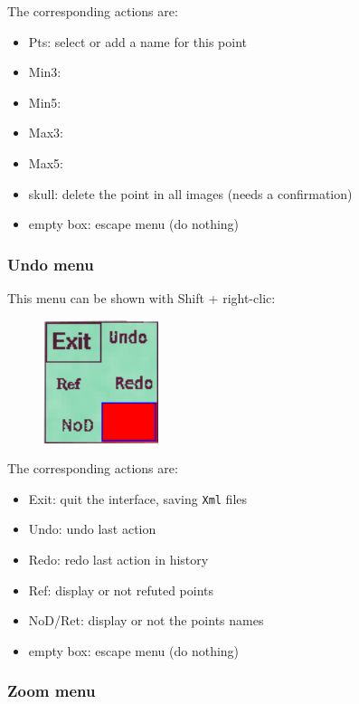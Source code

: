 The corresponding actions are:
\begin{itemize}
\item Pts: select or add a name for this point
\item Min3:
\item Min5:
\item Max3:
\item Max5:
\item skull: delete the point in all images (needs a confirmation)
\item empty box: escape menu (do nothing)
\end{itemize}

\subsubsection{Undo menu}

This menu can be shown with Shift + right-clic:

\begin{figure}[H]
\begin{center}
\includegraphics[width=95pt]{FIGS/Saisie/contextual.png}
\end{center}
\label{FIG:contextual}
\end{figure}

The corresponding actions are:

\begin{itemize}
\item Exit: quit the interface, saving {\tt Xml} files
\item Undo: undo last action
\item Redo: redo last action in history
\item Ref: display or not refuted points
\item NoD/Ret: display or not the points names
\item empty box: escape menu (do nothing)
\end{itemize}

\subsubsection{Zoom menu}

